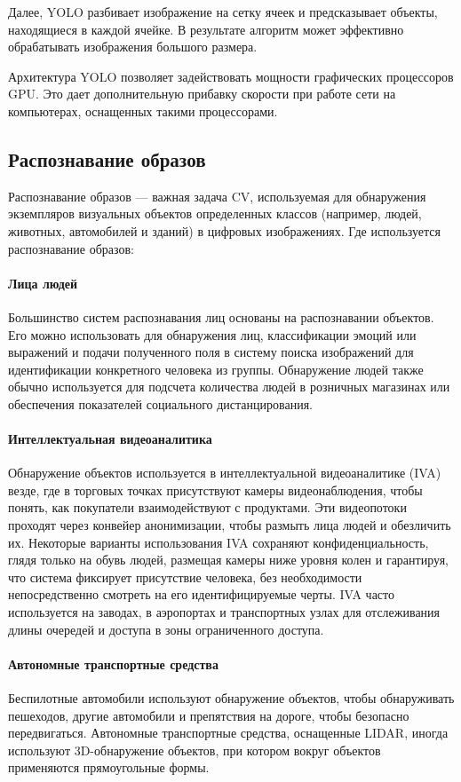 Далее, YOLO разбивает изображение на сетку ячеек и предсказывает объекты, находящиеся в каждой ячейке. В результате алгоритм может эффективно обрабатывать изображения большого размера.

Архитектура YOLO позволяет задействовать мощности графических процессоров GPU. Это дает дополнительную прибавку скорости при работе сети на компьютерах, оснащенных такими процессорами.

\subsection{Распознавание образов}

Распознавание образов — важная задача CV, используемая для обнаружения экземпляров визуальных объектов определенных классов (например, людей, животных, автомобилей и зданий) в цифровых изображениях.
Где используется распознавание образов:

\paragraph{Лица людей}
Большинство систем распознавания лиц основаны на распознавании объектов. Его можно использовать для обнаружения лиц, классификации эмоций или выражений и подачи полученного поля в систему поиска изображений для идентификации конкретного человека из группы.
Обнаружение людей также обычно используется для подсчета количества людей в розничных магазинах или обеспечения показателей социального дистанцирования.

\paragraph{Интеллектуальная видеоаналитика} Обнаружение объектов используется в интеллектуальной видеоаналитике (IVA) везде, где в торговых точках присутствуют камеры видеонаблюдения, чтобы понять, как покупатели взаимодействуют с продуктами. Эти видеопотоки проходят через конвейер анонимизации, чтобы размыть лица людей и обезличить их. Некоторые варианты использования IVA сохраняют конфиденциальность, глядя только на обувь людей, размещая камеры ниже уровня колен и гарантируя, что система фиксирует присутствие человека, без необходимости непосредственно смотреть на его идентифицируемые черты. IVA часто используется на заводах, в аэропортах и транспортных узлах для отслеживания длины очередей и доступа в зоны ограниченного доступа.

\paragraph{Автономные транспортные средства}
Беспилотные автомобили используют обнаружение объектов, чтобы обнаруживать пешеходов, другие автомобили и препятствия на дороге, чтобы безопасно передвигаться. Автономные транспортные средства, оснащенные LIDAR, иногда используют 3D-обнаружение объектов, при котором вокруг объектов применяются прямоугольные формы.

